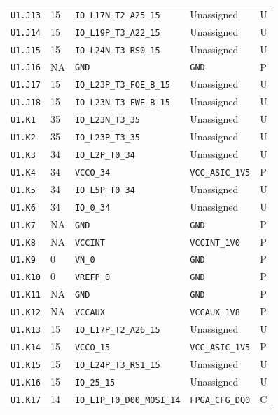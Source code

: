 \documentclass[11pt,a4paper]{article}
\begin{document}
\begin{longtable}{@{}P{20mm}P{10mm}P{70mm}P{51mm}P{11mm}@{}}
\nolinkurl{U1.J13} & 15 & \nolinkurl{IO_L17N_T2_A25_15} & Unassigned & U \\
\nolinkurl{U1.J14} & 15 & \nolinkurl{IO_L19P_T3_A22_15} & Unassigned & U \\
\nolinkurl{U1.J15} & 15 & \nolinkurl{IO_L24N_T3_RS0_15} & Unassigned & U \\
\nolinkurl{U1.J16} & NA & \nolinkurl{GND} & \nolinkurl{GND} & P \\
\nolinkurl{U1.J17} & 15 & \nolinkurl{IO_L23P_T3_FOE_B_15} & Unassigned & U \\
\nolinkurl{U1.J18} & 15 & \nolinkurl{IO_L23N_T3_FWE_B_15} & Unassigned & U \\
\nolinkurl{U1.K1} & 35 & \nolinkurl{IO_L23N_T3_35} & Unassigned & U \\
\nolinkurl{U1.K2} & 35 & \nolinkurl{IO_L23P_T3_35} & Unassigned & U \\
\nolinkurl{U1.K3} & 34 & \nolinkurl{IO_L2P_T0_34} & Unassigned & U \\
\nolinkurl{U1.K4} & 34 & \nolinkurl{VCCO_34} & \nolinkurl{VCC_ASIC_1V5} & P \\
\nolinkurl{U1.K5} & 34 & \nolinkurl{IO_L5P_T0_34} & Unassigned & U \\
\nolinkurl{U1.K6} & 34 & \nolinkurl{IO_0_34} & Unassigned & U \\
\nolinkurl{U1.K7} & NA & \nolinkurl{GND} & \nolinkurl{GND} & P \\
\nolinkurl{U1.K8} & NA & \nolinkurl{VCCINT} & \nolinkurl{VCCINT_1V0} & P \\
\nolinkurl{U1.K9} & 0 & \nolinkurl{VN_0} & \nolinkurl{GND} & P \\
\nolinkurl{U1.K10} & 0 & \nolinkurl{VREFP_0} & \nolinkurl{GND} & P \\
\nolinkurl{U1.K11} & NA & \nolinkurl{GND} & \nolinkurl{GND} & P \\
\nolinkurl{U1.K12} & NA & \nolinkurl{VCCAUX} & \nolinkurl{VCCAUX_1V8} & P \\
\nolinkurl{U1.K13} & 15 & \nolinkurl{IO_L17P_T2_A26_15} & Unassigned & U \\
\nolinkurl{U1.K14} & 15 & \nolinkurl{VCCO_15} & \nolinkurl{VCC_ASIC_1V5} & P \\
\nolinkurl{U1.K15} & 15 & \nolinkurl{IO_L24P_T3_RS1_15} & Unassigned & U \\
\nolinkurl{U1.K16} & 15 & \nolinkurl{IO_25_15} & Unassigned & U \\
\nolinkurl{U1.K17} & 14 & \nolinkurl{IO_L1P_T0_D00_MOSI_14} & \nolinkurl{FPGA_CFG_DQ0} & C \\

\end{longtable}
\end{document}
